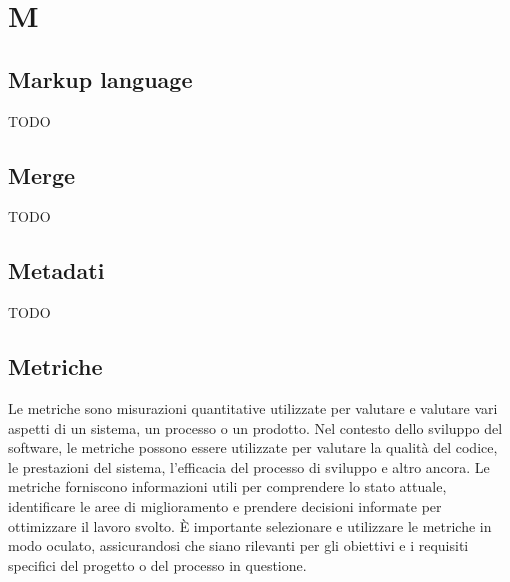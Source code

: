 \section{M}
\vspace{2em}
\subsection*{Markup language}
TODO

\vspace{2em}
\subsection*{Merge}
TODO

\vspace{2em}
\subsection*{Metadati}
TODO

\vspace{2em}
\subsection*{Metriche}
Le metriche sono misurazioni quantitative utilizzate per valutare e valutare vari aspetti di un sistema, un processo o un prodotto. Nel contesto dello sviluppo del software, le metriche possono essere utilizzate per valutare la qualità del codice, le prestazioni del sistema, l'efficacia del processo di sviluppo e altro ancora. Le metriche forniscono informazioni utili per comprendere lo stato attuale, identificare le aree di miglioramento e prendere decisioni informate per ottimizzare il lavoro svolto. È importante selezionare e utilizzare le metriche in modo oculato, assicurandosi che siano rilevanti per gli obiettivi e i requisiti specifici del progetto o del processo in questione.



